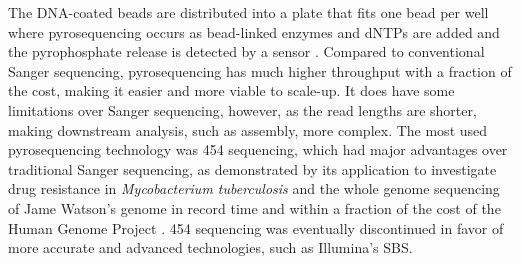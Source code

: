 The \ac{DNA}-coated beads are distributed into a plate that fits one bead per well where pyrosequencing occurs as bead-linked enzymes and \ac{dNTPs} are added and the pyrophosphate release is detected by a sensor \cite{heather_sequence_2016, nyren_history_2015, ronaghi_sequencing_1998, nyren_enzymatic_1987}. Compared to conventional Sanger sequencing, pyrosequencing has much higher throughput with a fraction of the cost, making it easier and more viable to scale-up. It does have some limitations over Sanger sequencing, however, as the read lengths are shorter, making downstream analysis, such as assembly, more complex. The most used pyrosequencing technology was 454 sequencing, which had major advantages over traditional Sanger sequencing, as demonstrated by its application to investigate drug resistance in \textit{Mycobacterium tuberculosis} \cite{andries_diarylquinoline_2005} and the whole genome sequencing of Jame Watson’s genome in record time and within a fraction of the cost of the Human Genome Project \cite{rothberg_development_2008, wheeler_complete_2008}. 454 sequencing was eventually discontinued in favor of more accurate and advanced technologies, such as Illumina’s \ac{SBS}.
